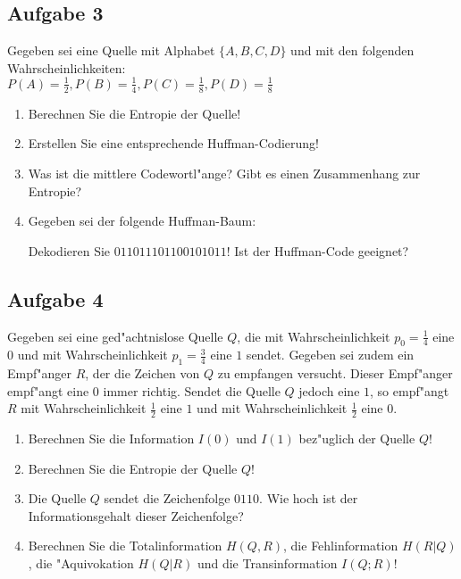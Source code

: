 \documentclass[10pt,oneside,onecolumn,a4paper,german,titlepage]{article}
\begin{document}
\subsection*{Aufgabe 3}
Gegeben sei eine Quelle mit Alphabet $\{A,B,C,D\}$ und mit den folgenden
Wahrscheinlichkeiten:\\
$P(A)=\frac{1}{2}, P(B)=\frac{1}{4}, P(C)=\frac{1}{8}, P(D)=\frac{1}{8}$
\begin{enumerate}
\item Berechnen Sie die Entropie der Quelle!
\item Erstellen Sie eine entsprechende Huffman-Codierung!
\item Was ist die mittlere Codewortl"ange? Gibt es einen Zusammenhang zur Entropie?
\item Gegeben sei der folgende Huffman-Baum:
\begin{center}
\end{center}
Dekodieren Sie $011011101100101011$! Ist der Huffman-Code geeignet?
\end{enumerate}

\subsection*{Aufgabe 4}
Gegeben sei eine ged"achtnislose Quelle $Q$, die mit Wahrscheinlichkeit $p_0 =
\frac{1}{4}$ eine $0$ und mit Wahrscheinlichkeit $p_1 = \frac{3}{4}$ eine $1$ sendet.
Gegeben sei zudem ein Empf"anger $R$, der die Zeichen von $Q$ zu empfangen versucht.
Dieser Empf"anger empf"angt eine $0$ immer richtig. Sendet die Quelle $Q$ jedoch
eine $1$, so empf"angt $R$ mit Wahrscheinlichkeit $\frac{1}{2}$ eine $1$ und mit
Wahrscheinlichkeit $\frac{1}{2}$ eine $0$.
\begin{enumerate}
\item Berechnen Sie die Information $I(0)$ und $I(1)$ bez"uglich der Quelle $Q$!
\item Berechnen Sie die Entropie der Quelle $Q$!
\item Die Quelle $Q$ sendet die Zeichenfolge $0110$. Wie hoch ist der
Informationsgehalt dieser Zeichenfolge?
\item Berechnen Sie die Totalinformation $H(Q,R)$, die Fehlinformation $H(R|Q)$,
die "Aquivokation $H(Q|R)$ und die Transinformation $I(Q;R)$!
\end{enumerate}
\end{document}
